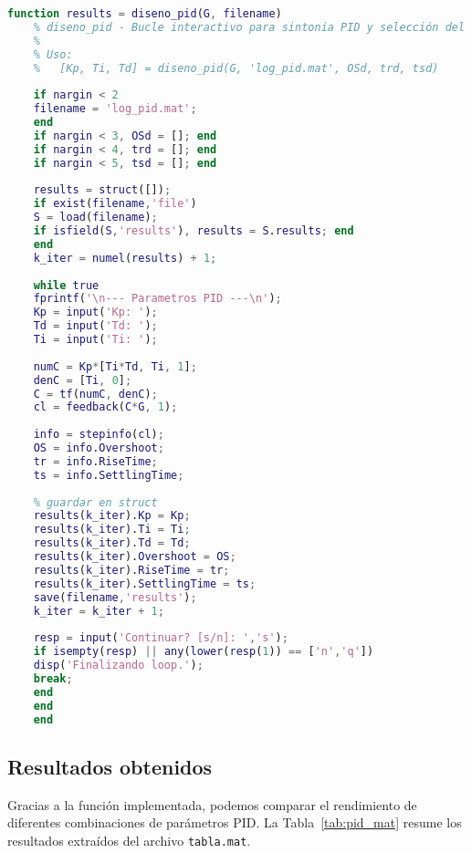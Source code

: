 \begin{lstlisting}[language=Matlab, caption={Función para diseño PID por prueba y error}, label={lst:disenoPID}]
	function results = diseno_pid(G, filename)
	% diseno_pid - Bucle interactivo para sintonia PID y selección del mejor ensayo
	%
	% Uso:
	%   [Kp, Ti, Td] = diseno_pid(G, 'log_pid.mat', OSd, trd, tsd)
	
	if nargin < 2
	filename = 'log_pid.mat';
	end
	if nargin < 3, OSd = []; end
	if nargin < 4, trd = []; end
	if nargin < 5, tsd = []; end
	
	results = struct([]);
	if exist(filename,'file')
	S = load(filename);
	if isfield(S,'results'), results = S.results; end
	end
	k_iter = numel(results) + 1;
	
	while true
	fprintf('\n--- Parametros PID ---\n');
	Kp = input('Kp: ');
	Td = input('Td: ');
	Ti = input('Ti: ');
	
	numC = Kp*[Ti*Td, Ti, 1];
	denC = [Ti, 0];
	C = tf(numC, denC);
	cl = feedback(C*G, 1);
	
	info = stepinfo(cl);
	OS = info.Overshoot;
	tr = info.RiseTime;
	ts = info.SettlingTime;
	
	% guardar en struct
	results(k_iter).Kp = Kp;
	results(k_iter).Ti = Ti;
	results(k_iter).Td = Td;
	results(k_iter).Overshoot = OS;
	results(k_iter).RiseTime = tr;
	results(k_iter).SettlingTime = ts;
	save(filename,'results');
	k_iter = k_iter + 1;
	
	resp = input('Continuar? [s/n]: ','s');
	if isempty(resp) || any(lower(resp(1)) == ['n','q'])
	disp('Finalizando loop.');
	break;
	end
	end
	end
\end{lstlisting}

\subsection{Resultados obtenidos}

Gracias a la función implementada, podemos comparar el rendimiento de diferentes combinaciones de parámetros PID. 
La Tabla~\ref{tab:pid_mat} resume los resultados extraídos del archivo \texttt{tabla.mat}.

